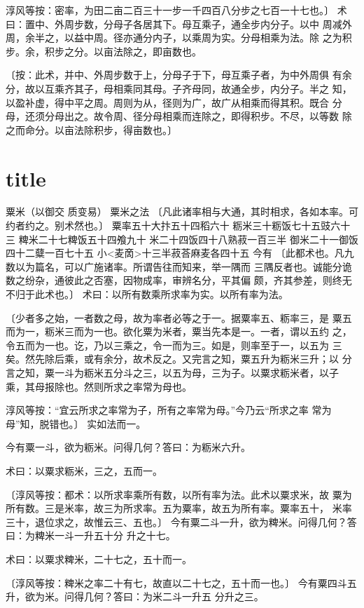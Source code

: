 \documentclass[a4paper,12pt,UTF8,twoside]{ctexbook}
\begin{document}
淳风等按：密率，为田二亩二百三十一步一千四百八分步之七百一十七也。〕 术曰：置中、外周步数，分母子各居其下。母互乘子，通全步内分子。以中 周减外周，余半之，以益中周。径亦通分内子，以乘周为实。分母相乘为法。除 之为积步。余，积步之分。以亩法除之，即亩数也。

〔按：此术，并中、外周步数于上，分母子于下，母互乘子者，为中外周俱 有余分，故以互乘齐其子，母相乘同其母。子齐母同，故通全步，内分子。半之 知，以盈补虚，得中平之周。周则为从，径则为广，故广从相乘而得其积。既合 分母，还须分母出之。故令周、径分母相乘而连除之，即得积步。不尽，以等数 除之而命分。以亩法除积步，得亩数也。〕 

\chapter{title}
粟米（以御交 质变易） 粟米之法 〔凡此诸率相与大通，其时相求，各如本率。可约者约之。别术然也。〕 粟率五十大抃五十四稻六十 粝米三十粝饭七十五豉六十三 粺米二十七粺饭五十四飧九十 米二十四饭四十八熟菽一百三半 御米二十一御饭四十二糵一百七十五 小<麦啇>十三半菽荅麻麦各四十五 今有 〔此都术也。凡九数以为篇名，可以广施诸率。所谓告往而知来，举一隅而 三隅反者也。诚能分诡数之纷杂，通彼此之否塞，因物成率，审辨名分，平其偏 颇，齐其参差，则终无不归于此术也。〕 术曰：以所有数乘所求率为实。以所有率为法。

〔少者多之始，一者数之母，故为率者必等之于一。据粟率五、粝率三，是 粟五而为一，粝米三而为一也。欲化粟为米者，粟当先本是一。一者，谓以五约 之，令五而为一也。讫，乃以三乘之，令一而为三。如是，则率至于一，以五为 三矣。然先除后乘，或有余分，故术反之。又完言之知，粟五升为粝米三升；以 分言之知，粟一斗为粝米五分斗之三，以五为母，三为子。以粟求粝米者，以子 乘，其母报除也。然则所求之率常为母也。

淳风等按：“宜云所求之率常为子，所有之率常为母。”今乃云“所求之率 常为母”知，脱错也。〕 实如法而一。

今有粟一斗，欲为粝米。问得几何？答曰：为粝米六升。

术曰：以粟求粝米，三之，五而一。

〔淳风等按：都术：以所求率乘所有数，以所有率为法。此术以粟求米，故 粟为所有数。三是米率，故三为所求率。五为粟率，故五为所有率。粟率五十， 米率三十，退位求之，故惟云三、五也。〕 今有粟二斗一升，欲为粺米。问得几何？答曰：为粺米一斗一升五十分 升之十七。

术曰：以粟求粺米，二十七之，五十而一。

〔淳风等按：粺米之率二十有七，故直以二十七之，五十而一也。〕 今有粟四斗五升，欲为米。问得几何？答曰：为米二斗一升五 分升之三。
\end{document}
